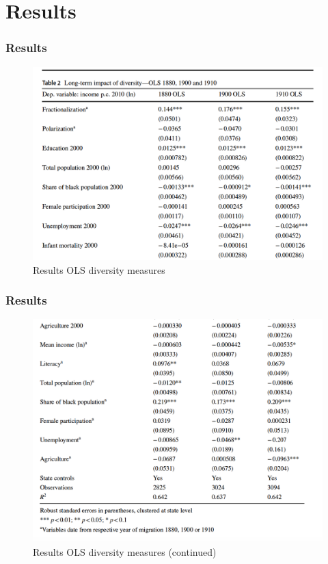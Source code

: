 \documentclass[pdftex,12pt,xcolor=pdftex,table]{beamer}
\begin{document}
\section{Results}

\begin{frame}
\frametitle{Results}

\begin{figure}
	\begin{center}
	 \caption{\textmd{Results OLS diversity measures}}
	\includegraphics[scale=0.45]{results11.png} 
	\end{center}
\end{figure}


\end{frame}



\begin{frame}
\frametitle{Results}

\begin{figure}
	\begin{center}
	 \caption{\textmd{Results OLS diversity measures (continued)}}
	\includegraphics[scale=0.43]{results12.png} 
	\end{center}
\end{figure}


\end{frame}
\end{document}
